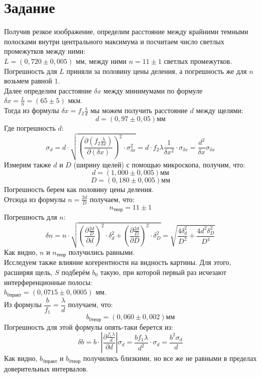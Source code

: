 \documentclass[a4paper,12pt]{extarticle}
\begin{document}
\section*{Задание}
Получив резкое изображение, определим расстояние между крайними темными полосками внутри центрального максимума и посчитаем число светлых промежутков между ними:\\
$L = (0,720 \pm 0,005)$ мм, между ними $n = 11 \pm 1$ светлых промежутков.\\
Погрешность для $L$ приняли за половину цены деления, а погрешность же для $n$ возьмем равной $1$.\\
Далее определим расстояние $\delta x$ между минимумами по формуле $\delta x = \frac{L}{n} = (65 \pm 5)$ мкм.\\
Тогда из формулы $\delta x = f_2 \frac{\lambda}{d}$ мы можем получить расстояние $d$ между щелями:
\[d = (0,97 \pm 0,05) \text{мм}\]
Где погрешность $d$:
\[\sigma_d = d \cdot \sqrt{\left(\dfrac{\partial \left(f_2 \frac{\lambda}{\delta x}  \right)}{\partial \left(\delta x\right)}\right)^{2} \cdot \sigma_{\delta x}^2} = d \cdot f_2\lambda \dfrac{1}{\delta x^2} \cdot \sigma_{\delta x} = \dfrac{d^2}{\delta x} \sigma_{\delta x}\]
Измерим также $d$ и $D$ (ширину щелей) с помощью микроскопа, получим, что:
\[d = (1,000 \pm 0,005) \text{мм}\]
\[D = (0,180 \pm 0,005) \text{мм}\]
Погрешность берем как половину цены деления.\\
Отсюда из формулы $n = \frac{2d}{D}$ получаем, что:
\[n_{\text{теор}} = 11 \pm 1\]
Погрешность для $n$:
\[\delta n = n \cdot \sqrt{\left(\dfrac{\partial \frac{2d}{D}}{\partial d}\right)^{2} \cdot \delta_{d}^2 + \left(\dfrac{\partial \frac{2d}{D}}{\partial D}\right)^{2} \cdot \delta_{D}^2} = \sqrt{\dfrac{4\delta_d^2}{D^2} + \dfrac{4d^2\delta_{D}^2}{D^4}}\]
Как видно, $n$ и $n_{\text{теор}}$ получились равными.\\
Исследуем также влияние когерентности на видность картины. Для этого, расширяя щель, $S$ подберём $b_0$ такую, при которой первый раз исчезают интерференционные полосы:\\
$b_{0\text{практ}} = (0,0715 \pm 0,0005)$ мм.\\
Из формулы $\dfrac{b}{f_1} = \dfrac{\lambda}{d}$ получаем, что: 
\[b_{0\text{теор}} = (0,060 \pm 0,002) \text{мм}\]
Погрешность для этой формулы опять-таки берется из:
\[\delta b = b \cdot \left|\dfrac{\partial \frac{f_1 \lambda}{d}}{\partial d}\right| \sigma_d = \dfrac{b f_1 \lambda}{d^2} \cdot \sigma_d = \dfrac{b^2\sigma_d}{d}\]
Как видно, $b_{0\text{практ}}$ и $b_{0\text{теор}}$ получились близкими, но все же не равными в пределах доверительных интервалов.
\end{document}
